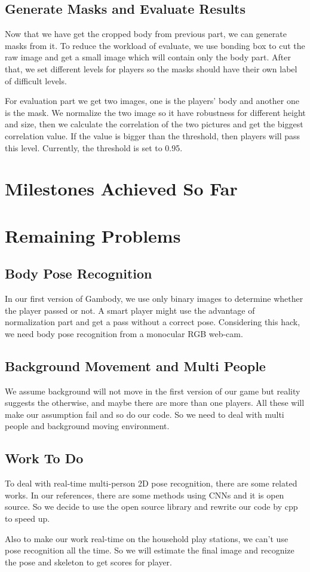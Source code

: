 \documentclass[conference,compsoc]{IEEEtran}
\begin{document}
	\subsection{Generate Masks and Evaluate Results}
		Now that we have get the cropped body from previous part, we can generate masks from it. 
		To reduce the workload of evaluate, we use bonding box to cut the raw image and get a small image which will contain only the body part.
		After that, we set different levels for players so the masks should have their own label of difficult levels.
	\par
		For evaluation part we get two images, one is the players' body and another one is the mask. 
		We normalize the two image so it have robustness for different height and size, then we calculate the correlation of the two pictures and get the biggest correlation value. 
		If the value is bigger than the threshold, then players will pass this level.
		Currently, the threshold is set to 0.95.
\section{Milestones Achieved So Far}
\section{Remaining Problems}
	\subsection{Body Pose Recognition}
		In our first version of Gambody, we use only binary images to determine whether the player passed or not. 
		A smart player might use the advantage of normalization part and get a pass without a correct pose. 
		Considering this hack, we need body pose recognition from a monocular RGB web-cam.
	\subsection{Background Movement and Multi People}
		We assume background will not move in the first version of our game but reality suggests the otherwise, and maybe there are more than one players. 
		All these will make our assumption fail and so do our code. So we need to deal with multi people and background moving environment.\par
	\subsection{Work To Do}
		To deal with real-time multi-person 2D pose recognition, there are some related works. 
		In our references, there are some methods using CNNs and it is open source. 
		So we decide to use the open source library and rewrite our code by cpp to speed up.\par
		Also to make our work real-time on the household play stations, we can't use pose recognition all the time. So we will estimate the final image and recognize the pose and skeleton to get scores for player.



% 
\end{document}
